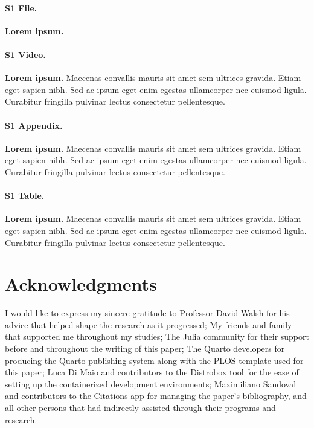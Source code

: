 \documentclass[
  10pt,
  letterpaper,
]{article}
\begin{document}
\paragraph*{S1 File.}
\label{s1-file}
{\textbf{Lorem ipsum.}}

\paragraph*{S1 Video.}
\label{s1-video}
{\textbf{Lorem ipsum.}} Maecenas convallis mauris sit amet sem ultrices
gravida. Etiam eget sapien nibh. Sed ac ipsum eget enim egestas
ullamcorper nec euismod ligula. Curabitur fringilla pulvinar lectus
consectetur pellentesque.

\paragraph*{S1 Appendix.}
\label{s1-appendix}
{\textbf{Lorem ipsum.}} Maecenas convallis mauris sit amet sem ultrices
gravida. Etiam eget sapien nibh. Sed ac ipsum eget enim egestas
ullamcorper nec euismod ligula. Curabitur fringilla pulvinar lectus
consectetur pellentesque.

\paragraph*{S1 Table.}
\label{s1-table}
{\textbf{Lorem ipsum.}} Maecenas convallis mauris sit amet sem ultrices
gravida. Etiam eget sapien nibh. Sed ac ipsum eget enim egestas
ullamcorper nec euismod ligula. Curabitur fringilla pulvinar lectus
consectetur pellentesque.

\hypertarget{acknowledgments}{%
\section{Acknowledgments}\label{acknowledgments}}

I would like to express my sincere gratitude to Professor David Walsh
for his advice that helped shape the research as it progressed; My
friends and family that supported me throughout my studies; The Julia
community for their support before and throughout the writing of this
paper; The Quarto developers for producing the Quarto publishing
system\citep{Allaire_Quarto_2022} along with the PLOS template used for
this paper; Luca Di Maio and contributors to the Distrobox tool for the
ease of setting up the containerized development
environments\citep{maio}; Maximiliano Sandoval and contributors to the
Citations app for managing the paper's bibliography\citep{sandoval}, and
all other persons that had indirectly assisted through their programs
and research.


\nolinenumbers
  
\end{document}
